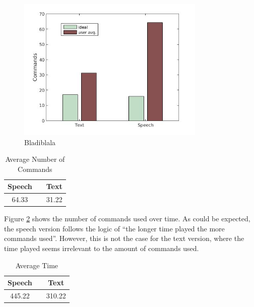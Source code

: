 \begin{figure}[h!]
  \centering
  \includegraphics[width=0.8\textwidth]{images/ideal_cmd.jpg}
  \caption{Bladiblala}\label{ideal_cmd}
\end{figure}

\begin{table}[h!]
  \centering
  \begin{tabular}{ccc}
    \toprule
    Speech &   & Text\\
    \midrule
    64.33 &   & 31.22\\
    \bottomrule
  \end{tabular}
  \caption{Average Number of Commands}\label{avg_cmd} %
\end{table}

Figure \ref{avg_time} shows the number of commands used over time. As could be expected, the speech version follows the logic of ``the longer time played the more commands used''. However, this is not the case for the text version, where the time played seems irrelevant to the amount of commands used.

\begin{table}[h!]
  \centering
  \begin{tabular}{ccc}
    \toprule
    Speech &   & Text\\
    \midrule
    445.22 &   & 310.22\\
    \bottomrule
  \end{tabular}
  \caption{Average Time}\label{avg_time}
\end{table}

